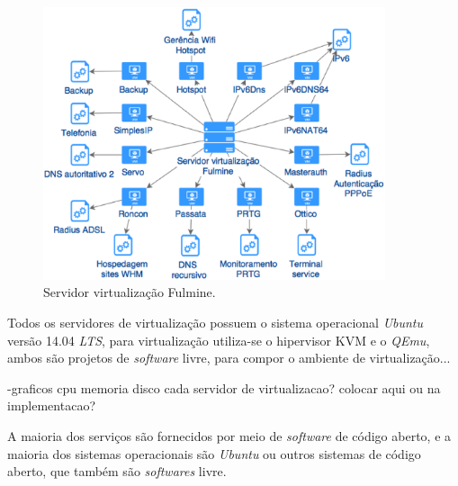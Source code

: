 \begin{figure}[servlog2]
 \centering
 \includegraphics[width=380px]{img/servlog2.eps}
 \caption{Servidor virtualização Fulmine.}
 \label{fig:servlog2}
\end{figure}

Todos os servidores de virtualização possuem o sistema operacional \textit{Ubuntu} versão 14.04 \textit{LTS}, para virtualização utiliza-se o 
hipervisor \ac{KVM} e o \textit{QEmu}, ambos são projetos de \textit{software} livre, para compor o ambiente de virtualização...

-graficos cpu memoria disco cada servidor de virtualizacao? colocar aqui ou na implementacao?

A maioria dos serviços são fornecidos por meio de \textit{software} de código aberto, e a maioria dos sistemas operacionais são \textit{Ubuntu}
ou outros sistemas de código aberto, que também são \textit{softwares} livre.

